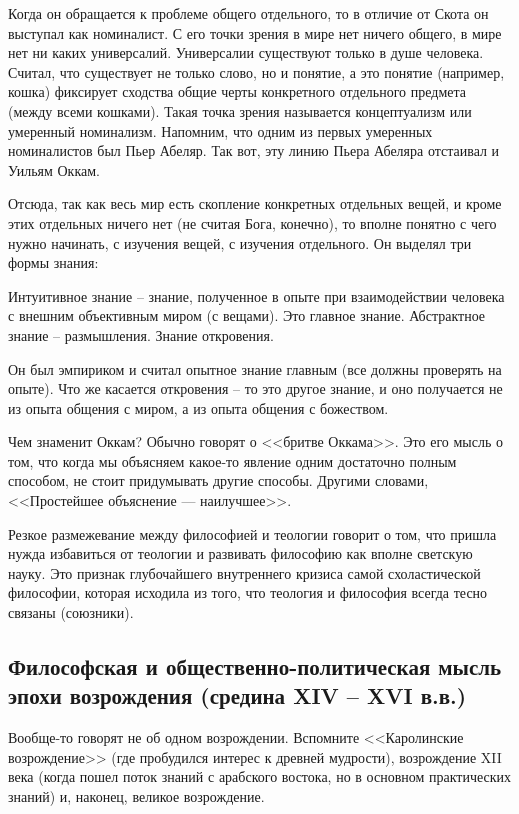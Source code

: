 Когда он обращается к проблеме общего отдельного, то в отличие от Скота он выступал как номиналист. С его точки зрения в мире нет ничего общего, в мире нет ни каких универсалий. Универсалии существуют только в душе человека. Считал, что существует не только слово, но и понятие, а это понятие (например, кошка) фиксирует сходства общие черты конкретного отдельного предмета (между всеми кошками). Такая точка зрения называется концептуализм или умеренный номинализм. Напомним, что одним из первых умеренных номиналистов был Пьер Абеляр. Так вот, эту линию Пьера Абеляра отстаивал и Уильям Оккам.

Отсюда, так как весь мир есть скопление конкретных отдельных вещей, и кроме этих отдельных ничего нет (не считая Бога, конечно), то вполне понятно с чего нужно начинать, с изучения вещей, с изучения отдельного. Он выделял три формы знания:

    Интуитивное знание – знание, полученное в опыте при взаимодействии человека с внешним объективным миром (с вещами). Это главное знание.
    Абстрактное знание – размышления.
    Знание откровения.

Он был эмпириком и считал опытное знание главным (все должны проверять на опыте). Что же касается откровения – то это другое знание, и оно получается не из опыта общения с миром, а из опыта общения с божеством.

Чем знаменит Оккам? Обычно говорят о <<бритве Оккама>>. Это его мысль о том, что когда мы объясняем какое-то явление одним достаточно полным способом, не стоит придумывать другие способы. Другими словами, <<Простейшее объяснение — наилучшее>>.

Резкое размежевание между философией и теологии говорит о том, что пришла нужда избавиться от теологии и развивать философию как вполне светскую науку. Это признак глубочайшего внутреннего кризиса самой схоластической философии, которая исходила из того, что теология и философия всегда тесно связаны (союзники).
\subsection{Философская и общественно-политическая мысль эпохи возрождения (средина XIV – XVI в.в.)}

Вообще-то говорят не об одном возрождении. Вспомните <<Каролинские возрождение>> (где пробудился интерес к древней мудрости), возрождение XII века (когда пошел поток знаний с арабского востока, но в основном практических знаний) и, наконец, великое возрождение.

